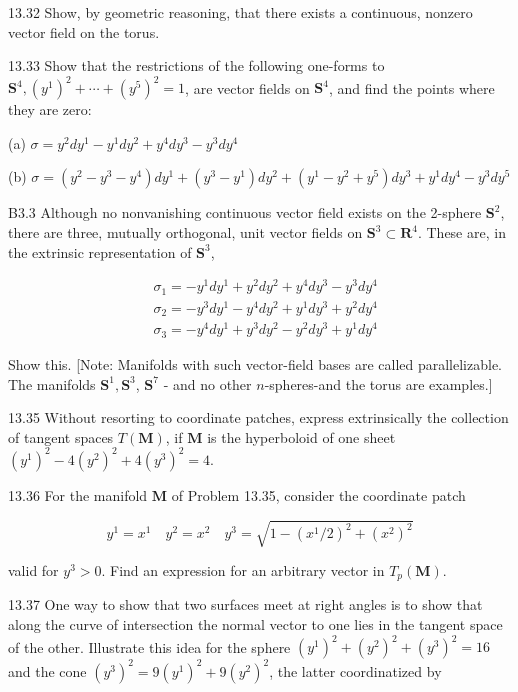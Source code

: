 \documentclass[10pt]{article}
\begin{document}
13.32 Show, by geometric reasoning, that there exists a continuous, nonzero vector field on the torus.

13.33 Show that the restrictions of the following one-forms to $\mathbf{S}^{4},\left(y^{1}\right)^{2}+\cdots+\left(y^{5}\right)^{2}=1$, are vector fields on $\mathbf{S}^{4}$, and find the points where they are zero:

(a) $\sigma=y^{2} d y^{1}-y^{1} d y^{2}+y^{4} d y^{3}-y^{3} d y^{4}$

(b) $\sigma=\left(y^{2}-y^{3}-y^{4}\right) d y^{1}+\left(y^{3}-y^{1}\right) d y^{2}+\left(y^{1}-y^{2}+y^{5}\right) d y^{3}+y^{1} d y^{4}-y^{3} d y^{5}$

B3.3 Although no nonvanishing continuous vector field exists on the 2-sphere $\mathbf{S}^{2}$, there are three, mutually orthogonal, unit vector fields on $\mathbf{S}^{3} \subset \mathbf{R}^{4}$. These are, in the extrinsic representation of $\mathbf{S}^{3}$,

$$
\begin{aligned}
& \sigma_{1}=-y^{1} d y^{1}+y^{2} d y^{2}+y^{4} d y^{3}-y^{3} d y^{4} \\
& \sigma_{2}=-y^{3} d y^{1}-y^{4} d y^{2}+y^{1} d y^{3}+y^{2} d y^{4} \\
& \sigma_{3}=-y^{4} d y^{1}+y^{3} d y^{2}-y^{2} d y^{3}+y^{1} d y^{4}
\end{aligned}
$$

Show this. [Note: Manifolds with such vector-field bases are called parallelizable. The manifolds $\mathbf{S}^{1}, \mathbf{S}^{3}$, $\mathbf{S}^{7}$ - and no other $n$-spheres-and the torus are examples.]

13.35 Without resorting to coordinate patches, express extrinsically the collection of tangent spaces $T(\mathbf{M})$, if $\mathbf{M}$ is the hyperboloid of one sheet $\left(y^{1}\right)^{2}-4\left(y^{2}\right)^{2}+4\left(y^{3}\right)^{2}=4$.

13.36 For the manifold $\mathbf{M}$ of Problem 13.35, consider the coordinate patch

$$
y^{1}=x^{1} \quad y^{2}=x^{2} \quad y^{3}=\sqrt{1-\left(x^{1} / 2\right)^{2}+\left(x^{2}\right)^{2}}
$$

valid for $y^{3}>0$. Find an expression for an arbitrary vector in $T_{p}(\mathbf{M})$.

13.37 One way to show that two surfaces meet at right angles is to show that along the curve of intersection the normal vector to one lies in the tangent space of the other. Illustrate this idea for the sphere $\left(y^{1}\right)^{2}+\left(y^{2}\right)^{2}+\left(y^{3}\right)^{2}=16$ and the cone $\left(y^{3}\right)^{2}=9\left(y^{1}\right)^{2}+9\left(y^{2}\right)^{2}$, the latter coordinatized by
\end{document}
